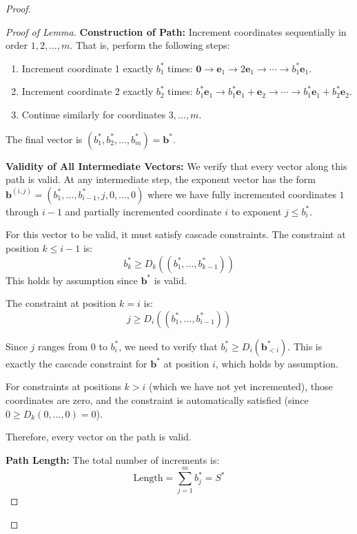 \begin{proof}
\begin{proof}[Proof of Lemma]
\textbf{Construction of Path:} Increment coordinates sequentially in order $1, 2, \ldots, m$. That is, perform the following steps:
\begin{enumerate}
\item Increment coordinate 1 exactly $b_1^*$ times: $\mathbf{0} \to \mathbf{e}_1 \to 2\mathbf{e}_1 \to \cdots \to b_1^* \mathbf{e}_1$.
\item Increment coordinate 2 exactly $b_2^*$ times: $b_1^* \mathbf{e}_1 \to b_1^* \mathbf{e}_1 + \mathbf{e}_2 \to \cdots \to b_1^* \mathbf{e}_1 + b_2^* \mathbf{e}_2$.
\item Continue similarly for coordinates $3, \ldots, m$.
\end{enumerate}

The final vector is $(b_1^*, b_2^*, \ldots, b_m^*) = \mathbf{b}^*$.

\textbf{Validity of All Intermediate Vectors:} We verify that every vector along this path is valid. At any intermediate step, the exponent vector has the form $\mathbf{b}^{(i,j)} = (b_1^*, \ldots, b_{i-1}^*, j, 0, \ldots, 0)$ where we have fully incremented coordinates $1$ through $i-1$ and partially incremented coordinate $i$ to exponent $j \leq b_i^*$.

For this vector to be valid, it must satisfy cascade constraints. The constraint at position $k \leq i-1$ is:
\begin{equation}
b_k^* \geq D_k((b_1^*, \ldots, b_{k-1}^*))
\end{equation}
This holds by assumption since $\mathbf{b}^*$ is valid.

The constraint at position $k = i$ is:
\begin{equation}
j \geq D_i((b_1^*, \ldots, b_{i-1}^*))
\end{equation}

Since $j$ ranges from $0$ to $b_i^*$, we need to verify that $b_i^* \geq D_i(\mathbf{b}_{<i}^*)$. This is exactly the cascade constraint for $\mathbf{b}^*$ at position $i$, which holds by assumption.

For constraints at positions $k > i$ (which we have not yet incremented), those coordinates are zero, and the constraint is automatically satisfied (since $0 \geq D_k(0, \ldots, 0) = 0$).

Therefore, every vector on the path is valid.

\textbf{Path Length:} The total number of increments is:
\begin{equation}
\text{Length} = \sum_{j=1}^m b_j^* = S^*
\end{equation}


\end{proof}
\end{proof}
